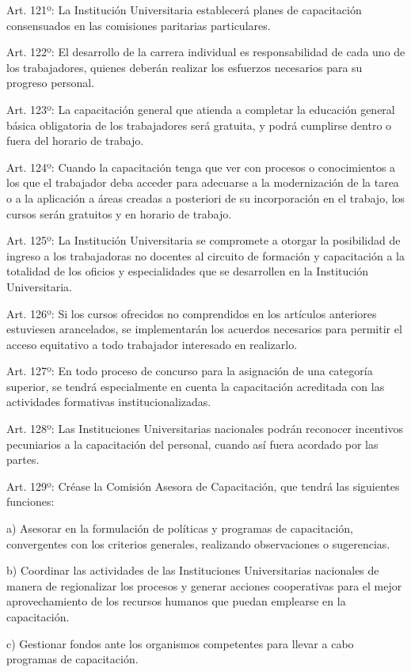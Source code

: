\documentclass[]{article}
\begin{document}
Art. 121º: La Institución Universitaria establecerá planes de
capacitación consensuados en las comisiones paritarias particulares.

Art. 122º: El desarrollo de la carrera individual es responsabilidad de
cada uno de los trabajadores, quienes deberán realizar los esfuerzos
necesarios para su progreso personal.

Art. 123º: La capacitación general que atienda a completar la educación
general básica obligatoria de los trabajadores será gratuita, y podrá
cumplirse dentro o fuera del horario de trabajo.

Art. 124º: Cuando la capacitación tenga que ver con procesos o
conocimientos a los que el trabajador deba acceder para adecuarse a la
modernización de la tarea o a la aplicación a áreas creadas a posteriori
de su incorporación en el trabajo, los cursos serán gratuitos y en
horario de trabajo.

Art. 125º: La Institución Universitaria se compromete a otorgar la
posibilidad de ingreso a los trabajadoras no docentes al circuito de
formación y capacitación a la totalidad de los oficios y especialidades
que se desarrollen en la Institución Universitaria.

Art. 126º: Si los cursos ofrecidos no comprendidos en los artículos
anteriores estuviesen arancelados, se implementarán los acuerdos
necesarios para permitir el acceso equitativo a todo trabajador
interesado en realizarlo.

Art. 127º: En todo proceso de concurso para la asignación de una
categoría superior, se tendrá especialmente en cuenta la capacitación
acreditada con las actividades formativas institucionalizadas.

Art. 128º: Las Instituciones Universitarias nacionales podrán reconocer
incentivos pecuniarios a la capacitación del personal, cuando así fuera
acordado por las partes.

Art. 129º: Créase la Comisión Asesora de Capacitación, que tendrá las
siguientes funciones:

a) Asesorar en la formulación de políticas y programas de capacitación,
convergentes con los criterios generales, realizando observaciones o
sugerencias.

b) Coordinar las actividades de las Instituciones Universitarias
nacionales de manera de regionalizar los procesos y generar acciones
cooperativas para el mejor aprovechamiento de los recursos humanos que
puedan emplearse en la capacitación.

c) Gestionar fondos ante los organismos competentes para llevar a cabo
programas de capacitación.
\end{document}
